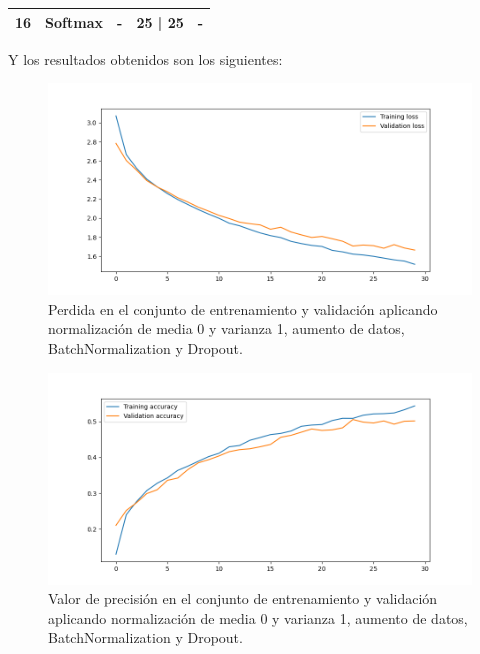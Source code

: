 \documentclass[12pt, spanish]{article}
\begin{document}
\begin{table}[H]
{\begin{tabular}{|c|c|c|c|c|}
16                      & Softmax               & -                                                                                    & 25 | 25                           & -                                                                                                 \\ \hline
\end{tabular}%
}
\end{table}

Y los resultados obtenidos son los siguientes:

\begin{figure}[H]
  \centering
      \includegraphics[width=\textwidth]{1-2-dropout.png}
 		\caption{Perdida en el conjunto de entrenamiento y validación aplicando normalización de media 0 y varianza 1, aumento de datos, BatchNormalization y Dropout.}
\end{figure}

\begin{figure}[H]
  \centering
      \includegraphics[width=\textwidth]{1-2-dropout-2.png}
 		\caption{Valor de precisión en el conjunto de entrenamiento y validación aplicando normalización de media 0 y varianza 1, aumento de datos, BatchNormalization y Dropout.}
\end{figure}
\end{document}
